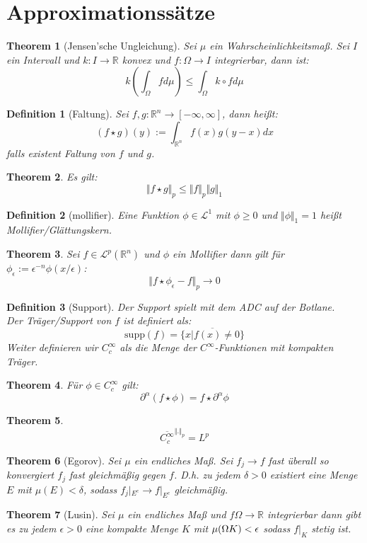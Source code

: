 \documentclass[10pt,a4paper]{article}
\newtheorem{theorem}{Theorem}
\newtheorem{definition}{Definition}
\begin{document}
\section{Approximationssätze}
\begin{theorem}[Jensen'sche Ungleichung]
	Sei $\mu$ ein Wahrscheinlichkeitsmaß. Sei $I$ ein Intervall und $k: I \to \mathbb{R}$ konvex und $f: \Omega \to I$ integrierbar, dann ist: 
	$$k(\int_\Omega f d\mu) \leq \int_\Omega k\circ f d\mu$$
\end{theorem}
\begin{definition}[Faltung]
	Sei $f,g: \mathbb{R}^n \to [-\infty, \infty]$, dann heißt:
	$$(f\star g )(y) := \int_{\mathbb{R}^n}f(x)g(y-x)dx$$
	falls existent Faltung von $f$ und $g$.
\end{definition}
\begin{theorem}
	Es gilt:
	$$\Vert f\star g\Vert_p \leq \Vert f\Vert_p\Vert g\Vert_1$$
\end{theorem}
\begin{definition}[mollifier]
	Eine Funktion $\phi\in\mathcal{L}^1 $ mit $\phi\geq 0$ und $\Vert \phi \Vert_1 = 1$ heißt Mollifier/Glättungskern.
\end{definition}
\begin{theorem}
	Sei $f\in \mathcal{L}^p(\mathbb{R}^n)$ und $\phi$ ein Mollifier dann gilt für $\phi_\epsilon:= \epsilon^{-n}\phi(x/\epsilon)$:
	$$\Vert f\star \phi_\epsilon -f\Vert_p \to 0$$
\end{theorem}
\begin{definition}[Support]
	Der Support spielt mit dem ADC auf der Botlane. \\
	Der Träger/Support von $f$ ist definiert als:
	$$\text{supp}(f) = \overline{\{x | f(x) \neq 0\}}$$
	Weiter definieren wir $C^\infty_c$ als die Menge der $C^\infty$-Funktionen mit kompakten Träger.
\end{definition}
\begin{theorem}
	Für $\phi \in C_c^\infty$ gilt:
	$$\partial^\alpha(f\star \phi) = f\star \partial^\alpha\phi$$
\end{theorem}
\begin{theorem}
	$$\overline{C_c^\infty}^{\Vert . \Vert_p} = L^p$$
\end{theorem}
\begin{theorem}[Egorov]
	Sei $\mu$ ein endliches Maß. Sei $f_j \to f$ fast überall so konvergiert $f_j$ fast gleichmäßig gegen $f$. D.h. zu jedem $\delta > 0$ existiert eine Menge $E$ mit $\mu(E) < \delta$, sodass $f_j|_{E^c} \to f|_{E^c}$ gleichmäßig.
\end{theorem}
\begin{theorem}[Lusin]
	Sei $\mu$ ein endliches Maß und $f \Omega \to \mathbb{R}$ integrierbar dann gibt es zu jedem $\epsilon > 0$ eine kompakte Menge $K$ mit $\mu(\Omega\\K) < \epsilon$ sodass $f|_K$ stetig ist.  
\end{theorem}
\end{document}
